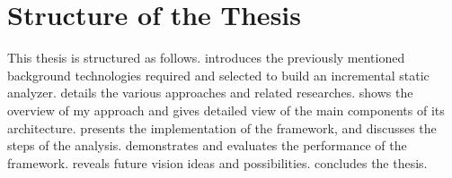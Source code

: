 \section{Structure of the Thesis}

This thesis is structured as follows.
 introduces the previously mentioned background technologies required and selected to build an incremental static analyzer.
 details the various approaches and related researches.
 shows the overview of my approach and gives detailed view of the main components of its architecture.
 presents the implementation of the framework, and discusses the steps of the analysis.
 demonstrates and evaluates the performance of the framework.
 reveals future vision ideas and possibilities.
 concludes the thesis.
